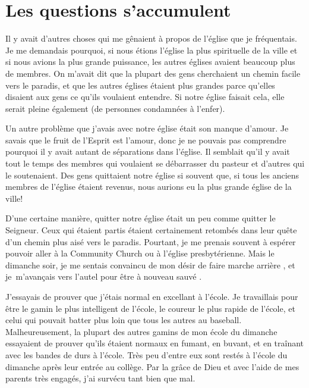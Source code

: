 \section{Les questions s'accumulent}

Il y avait d'autres choses qui me gênaient à propos de l'église que je
 fréquentais. Je me demandais pourquoi, si nous étions l'église la plus
 spirituelle de la ville et si nous avions la plus grande puissance, les autres
 églises avaient beaucoup plus de membres. On m'avait dit que la plupart des
 gens cherchaient un chemin facile vers le paradis, et que les autres églises
 étaient plus grandes parce qu'elles disaient aux gens ce qu'ils voulaient
 entendre. Si notre église faisait cela, elle serait pleine également
 (de personnes condamnées à l'enfer).

Un autre problème que j'avais avec notre église était son manque d'amour. Je
 savais que le fruit de l'Esprit est l'amour,
 donc je ne pouvais pas comprendre
 pourquoi il y avait autant de séparations dans l'église. Il semblait qu'il y
 avait tout le temps des membres qui voulaient se débarrasser du pasteur et
 d'autres qui le soutenaient. Des gens quittaient notre église si souvent que,
 si tous les anciens membres de l'église étaient revenus, nous aurions eu la
 plus grande église de la ville!

D'une certaine manière, quitter notre église était un peu comme quitter le
 Seigneur. Ceux qui étaient partis étaient certainement retombés dans leur quête
 d'un chemin plus aisé vers le paradis. Pourtant, je me prenais souvent à
 espérer pouvoir aller à la Community Church ou à l'église presbytérienne. Mais
 le dimanche soir, je me sentais convaincu de mon désir de \og faire marche
 arrière \fg{}, et je~m'avançais vers l'autel pour être à nouveau
 \og sauvé \fg{}.

J'essayais de prouver que j'étais normal en excellant à l'école. Je travaillais
 pour être le gamin le plus intelligent de l'école, le coureur le plus rapide de
 l'école, et celui qui pouvait batter plus loin que tous les autres au baseball.
 Malheureusement, la plupart des autres gamins de mon école du dimanche
 essayaient de prouver qu'ils étaient normaux en fumant, en buvant, et en
 traînant avec les bandes de durs à l'école. Très peu d'entre eux sont restés à
 l'école du dimanche après leur entrée au collège. Par la grâce de Dieu et avec
 l'aide de mes parents très engagés, j'ai survécu tant bien que mal.

